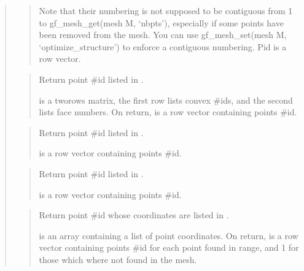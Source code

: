 \documentclass[a4paper,11pt,english]{sphinxmanual}
\begin{document}
\begin{quote}
\begin{quote}
\sphinxAtStartPar
Note that their numbering is not supposed to be contiguous from
1 to gf\_mesh\_get(mesh M, ‘nbpts’),
especially if some points have been removed from the mesh. You
can use gf\_mesh\_set(mesh M, ‘optimize\_structure’) to enforce a contiguous
numbering. Pid is a row vector.
\end{quote}

\sphinxAtStartPar
{}
\begin{quote}

\sphinxAtStartPar
Return point \#id listed in .

\sphinxAtStartPar
{} is a two\sphinxhyphen{}rows matrix, the first row lists convex \#ids,
and the second lists face numbers. On return,  is a
row vector containing points \#id.
\end{quote}

\sphinxAtStartPar
{}
\begin{quote}

\sphinxAtStartPar
Return point \#id listed in .

\sphinxAtStartPar
{} is a row vector containing points \#id.
\end{quote}

\sphinxAtStartPar
{}
\begin{quote}

\sphinxAtStartPar
Return point \#id listed in .

\sphinxAtStartPar
{} is a row vector containing points \#id.
\end{quote}

\sphinxAtStartPar
{}
\begin{quote}

\sphinxAtStartPar
Return point \#id whose coordinates are listed in .

\sphinxAtStartPar
{} is an array containing a list of point coordinates. On
return,  is a row vector containing points
\#id for each point found in  range, and \sphinxhyphen{}1 for those
which where not found in the mesh.
\end{quote}


\end{quote}
\end{document}
